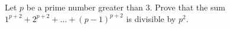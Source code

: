 Let $p$ be a prime number greater than $3$. Prove that the sum $1^{p+2} + 2^{p+2} + ...+ (p-1)^{p+2}$ is divisible by $p^2$.